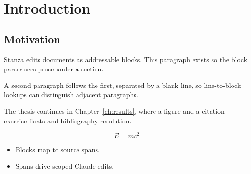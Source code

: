 \chapter{Introduction}
\label{ch:intro}

\section{Motivation}

Stanza edits  documents as addressable blocks. This
paragraph exists so the block parser sees prose under a section.

A second paragraph follows the first, separated by a blank line, so
line-to-block lookups can distinguish adjacent paragraphs.


The thesis continues in Chapter~\ref{ch:results}, where a figure and
a citation exercise floats and bibliography resolution.

\begin{equation}
  \label{eq:energy}
  E = mc^2
\end{equation}

\begin{itemize}
  \item Blocks map to source spans.
  \item Spans drive scoped Claude edits.
\end{itemize}
